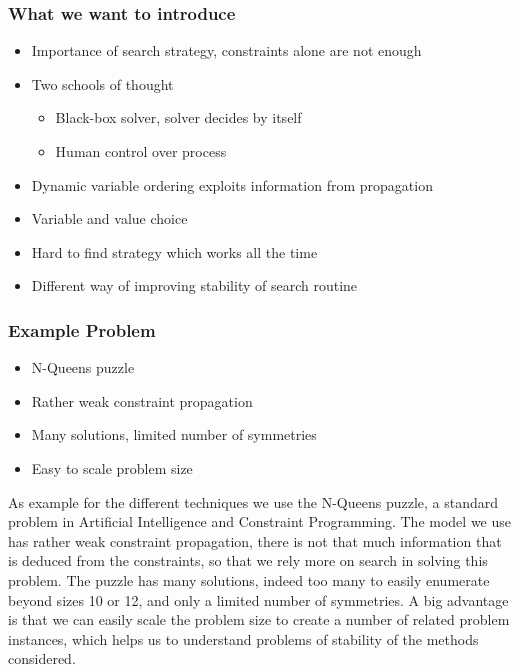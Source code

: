 \begin{frame}
\frametitle{What we want to introduce}
\begin{itemize}
\item Importance of search strategy, constraints alone are not enough
\item Two schools of thought
  \begin{itemize}
  \item Black-box solver, solver decides by itself
  \item Human control over process
  \end{itemize}
  
\item Dynamic variable ordering exploits information from propagation
\item Variable and value choice
\item Hard to find strategy which works all the time
\item Different way of improving stability of search routine
\end{itemize}
\end{frame}

\begin{frame}
\frametitle{Example Problem}
\begin{itemize}
\item N-Queens puzzle
\item Rather weak constraint propagation
\item Many solutions, limited number of symmetries
\item Easy to scale problem size
\end{itemize}
\end{frame}

As example for the different techniques we use the N-Queens puzzle, a standard problem in Artificial Intelligence and Constraint Programming. The model we use has rather weak constraint propagation, there is not that much information that is deduced from the constraints, so that we rely more on search in solving this problem. The puzzle has many solutions, indeed too many to easily enumerate beyond sizes 10 or 12, and only a limited number of symmetries. A big advantage is that we can easily scale the problem size to create a number of related problem instances, which helps us to understand problems of stability of the methods considered.

